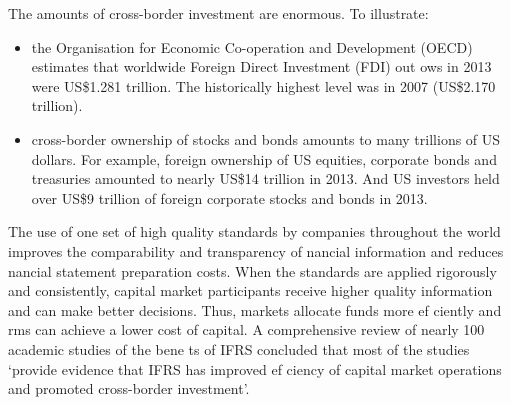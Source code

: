 The amounts of cross-border investment are enormous. To illustrate:
\begin{itemize}
	\item the Organisation for Economic Co-operation and Development (OECD) estimates that worldwide Foreign Direct Investment (FDI) out ows in 2013 were US\$1.281 trillion. The historically highest level was in 2007 (US\$2.170 trillion).
	\item cross-border ownership of stocks and bonds amounts to many trillions of US dollars. For example, foreign ownership of US equities, corporate bonds and treasuries amounted to nearly US\$14 trillion in 2013. And US investors held over US\$9 trillion of foreign corporate stocks and bonds in 2013.
\end{itemize}

The use of one set of high quality standards by companies throughout the world improves the comparability and transparency of  nancial information and reduces  nancial statement preparation costs. When the standards are applied rigorously and consistently, capital market participants receive higher quality information and can make better decisions.
Thus, markets allocate funds more ef ciently and  rms can achieve a lower cost of capital.
A comprehensive review of nearly 100 academic studies of the bene ts of IFRS concluded that most of the studies ‘provide evidence that IFRS has improved ef ciency of capital market operations and promoted cross-border investment’.




















